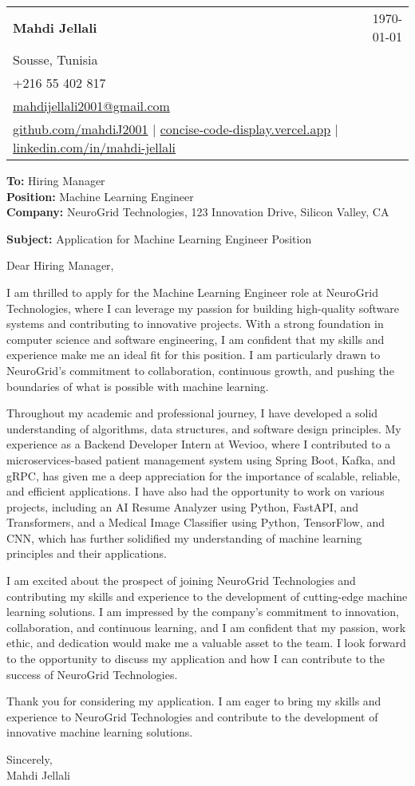 \documentclass[letterpaper,11pt]{article}
\makeatletter
\newcommand{\letterHeading}[5]{
    \begin{tabular*}{\textwidth}{l@{\extracolsep{\fill}}r}
    \textbf{\Large #1} & #5 \\  %
    #2 & \\
    #3 & \\
    #4 & \\
    \end{tabular*}
    \vspace{15pt}
}
\newcommand{\letterRecipient}[3]{
    \textbf{\large To:} #1 \\
    \textbf{\large Position:} #2 \\
    \textbf{\large Company:} #3 \\
    \vspace{12pt}
}
\newcommand{\letterSubject}[1]{
    \textbf{\large Subject:} #1 \\
    \vspace{15pt}
}
\makeatother
\begin{document}
    \letterHeading
    {Mahdi Jellali}
    {Sousse, Tunisia}
    {+216 55 402 817 \\ \href{mailto:mahdijellali2001@gmail.com}{mahdijellali2001@gmail.com}}
    {\href{https://github.com/mahdiJ2001}{github.com/mahdiJ2001} $|$ \href{https://concise-code-display.vercel.app/}{concise-code-display.vercel.app} $|$ \href{https://www.linkedin.com/in/mahdi-jellali/}{linkedin.com/in/mahdi-jellali}}
    {\today}

    \letterRecipient
    {Hiring Manager}
    {Machine Learning Engineer}
    {NeuroGrid Technologies, 123 Innovation Drive, Silicon Valley, CA}

    \letterSubject{Application for Machine Learning Engineer Position}

    Dear Hiring Manager,

    I am thrilled to apply for the Machine Learning Engineer role at NeuroGrid Technologies, where I can leverage my passion for building high-quality software systems and contributing to innovative projects. With a strong foundation in computer science and software engineering, I am confident that my skills and experience make me an ideal fit for this position. I am particularly drawn to NeuroGrid's commitment to collaboration, continuous growth, and pushing the boundaries of what is possible with machine learning.

    Throughout my academic and professional journey, I have developed a solid understanding of algorithms, data structures, and software design principles. My experience as a Backend Developer Intern at Wevioo, where I contributed to a microservices-based patient management system using Spring Boot, Kafka, and gRPC, has given me a deep appreciation for the importance of scalable, reliable, and efficient applications. I have also had the opportunity to work on various projects, including an AI Resume Analyzer using Python, FastAPI, and Transformers, and a Medical Image Classifier using Python, TensorFlow, and CNN, which has further solidified my understanding of machine learning principles and their applications.

    I am excited about the prospect of joining NeuroGrid Technologies and contributing my skills and experience to the development of cutting-edge machine learning solutions. I am impressed by the company's commitment to innovation, collaboration, and continuous learning, and I am confident that my passion, work ethic, and dedication would make me a valuable asset to the team. I look forward to the opportunity to discuss my application and how I can contribute to the success of NeuroGrid Technologies.

    Thank you for considering my application. I am eager to bring my skills and experience to NeuroGrid Technologies and contribute to the development of innovative machine learning solutions.

    Sincerely,\\[12pt]

    Mahdi Jellali
\end{document}
